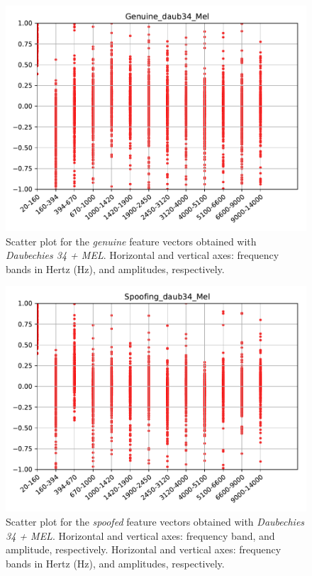 		\begin{figure}[H]
			\centering
			\includegraphics[scale=.7]{images/results/barkVersusMel/Genuine_daub34_Mel.pdf}
			\caption{Scatter plot for the \textit{genuine} feature vectors obtained with \textit{Daubechies 34 + MEL}. Horizontal and vertical axes: frequency bands in Hertz (Hz), and amplitudes, respectively.}
			\label{fig:livedaub34mel}
		\end{figure}
		\begin{figure}[H]
			\centering
			\includegraphics[scale=.7]{images/results/barkVersusMel/Spoofing_daub34_Mel.pdf}
			\caption{Scatter plot for the \textit{spoofed} feature vectors obtained with \textit{Daubechies 34 + MEL}. Horizontal and vertical axes: frequency band, and amplitude, respectively. Horizontal and vertical axes: frequency bands in Hertz (Hz), and amplitudes, respectively.}
			\label{fig:spoofingdaub34mel}
		\end{figure}
